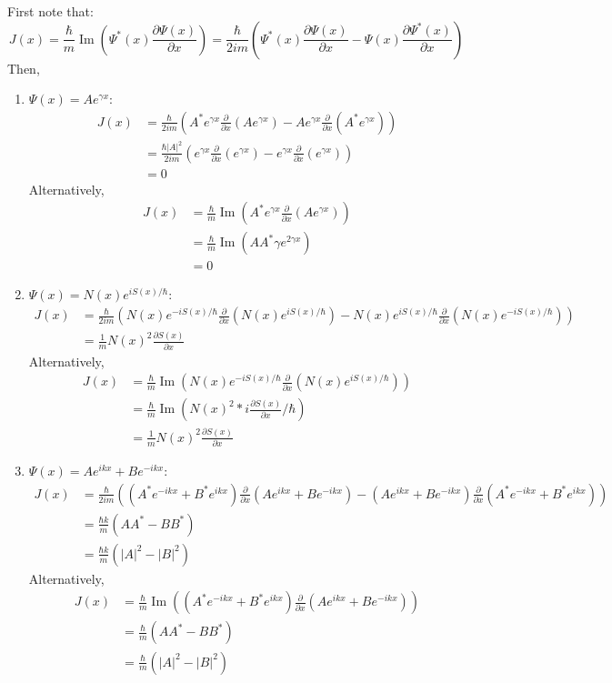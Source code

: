 \begin{sol}
First note that: $$ J(x) = \frac{\hbar}{m}\operatorname{Im}(\Psi^*(x)\frac{\partial \Psi(x)}{\partial x}) = \frac{\hbar}{2im}(\Psi^*(x)\frac{\partial \Psi(x)}{\partial x} - \Psi(x)\frac{\partial \Psi^*(x)}{\partial x})$$
Then,
\begin{enumerate}[label=\textbf{(\alph*)}]
\item $\Psi(x) = Ae^{\gamma x}$:
\begin{align*}J(x) &= \frac{\hbar}{2im}(A^*e^{\gamma x}\frac{\partial }{\partial x}(Ae^{\gamma x}) - Ae^{\gamma x}\frac{\partial}{\partial x}(A^*e^{\gamma x})) \\ &= \frac{\hbar|A|^2}{2im}(e^{\gamma x}\frac{\partial}{\partial x}(e^{\gamma x}) - e^{\gamma x}\frac{\partial}{\partial x}(e^{\gamma x})) \\ &= 0
\end{align*}
Alternatively,
\begin{align*}
    J(x) &= \frac{\hbar}{m}\operatorname{Im}(A^*e^{\gamma x}\frac{\partial}{\partial x}(Ae^{\gamma x})) \\ &= \frac{\hbar}{m}\operatorname{Im}(AA^*\gamma e^{2\gamma x}) \\ &= 0
\end{align*}
\item $\Psi(x) = N(x)e^{iS(x)/\hbar}$:
\begin{align*}
    J(x) &= \frac{\hbar}{2im}(N(x)e^{-iS(x)/\hbar}\frac{\partial}{\partial x}(N(x)e^{iS(x)/\hbar}) - N(x)e^{iS(x)/\hbar}\frac{\partial}{\partial x}(N(x)e^{-iS(x)/\hbar})) \\ &= \frac{1}{m}N(x)^2\frac{\partial S(x)}{\partial x}
\end{align*}
Alternatively,
\begin{align*}
    J(x) &= \frac{\hbar}{m}\operatorname{Im}(N(x)e^{-iS(x)/\hbar}\frac{\partial}{\partial x}(N(x)e^{iS(x)/\hbar})) \\ &= \frac{\hbar}{m}\operatorname{Im}(N(x)^2 * i\frac{\partial S(x)}{\partial x}/\hbar) \\ &= \frac{1}{m}N(x)^2\frac{\partial S(x)}{\partial x}
\end{align*}
\item $\Psi(x) = Ae^{ikx} + Be^{-ikx}$:
\begin{align*}
    J(x) &= \frac{\hbar}{2im}((A^*e^{-ikx} + B^*e^{ikx})\frac{\partial}{\partial x}(Ae^{ikx} + Be^{-ikx}) - (Ae^{ikx} + Be^{-ikx})\frac{\partial}{\partial x}(A^*e^{-ikx} + B^*e^{ikx})) \\ &= \frac{\hbar k}{m}(AA^* - BB^*) \\ &= \frac{\hbar k}{m}(|A|^2 - |B|^2)
\end{align*}
Alternatively,
\begin{align*}
    J(x) &= \frac{\hbar}{m}\operatorname{Im}((A^*e^{-ikx} + B^*e^{ikx})\frac{\partial}{\partial x}(Ae^{ikx} + Be^{-ikx})) \\ &= \frac{\hbar}{m}(AA^* - BB^*) \\ &= \frac{\hbar}{m}(|A|^2 - |B|^2)
\end{align*}

\end{enumerate}
\end{sol}